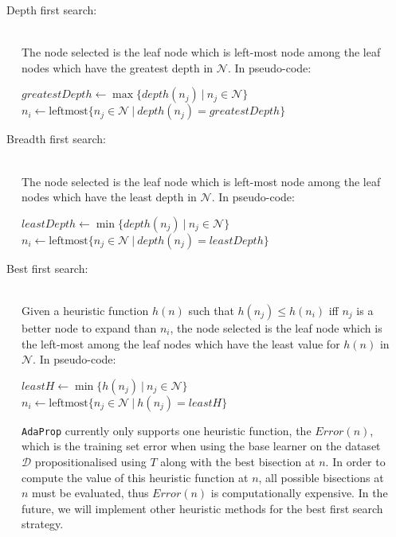 \documentclass[a4paper,12pt]{article} %
\newcommand{\AdaProp}{\texttt{AdaProp}\xspace}
\newcommand{\mcl}[1]{\mathcal{#1}}
\begin{document}
\begin{description}
\item[~~~Depth first search:] \ \\
    The node selected is the leaf node 
    which is left-most node among 
    the leaf nodes which have the greatest depth
    in $\mcl{N}$.
    In pseudo-code:
\begin{algorithmic}
    \State $ greatestDepth \gets \max\{ depth(n_j) ~\big|~ n_j \in \mcl{N} \} $
    \State $ n_i \gets \textrm{leftmost}\{ n_j \in \mcl{N} ~\big|~ depth(n_j) = greatestDepth \} $
\end{algorithmic}
        
\item[~~~Breadth first search:] \ \\
    The node selected is the leaf node 
    which is left-most node among 
    the leaf nodes which have the least depth
    in $\mcl{N}$.
    In pseudo-code:
\begin{algorithmic}
    \State $ leastDepth \gets \min\{ depth(n_j) ~\big|~ n_j \in \mcl{N} \} $
    \State $ n_i \gets \textrm{leftmost}\{ n_j \in \mcl{N} ~\big|~ depth(n_j) = leastDepth \} $
\end{algorithmic}
    
\item[~~~Best first search:] \ \\
    Given a heuristic function $h(n)$ such that
    $h(n_j) \leq h(n_i)$ iff $n_j$ is a better node to expand than $n_i$,
    the node selected is the leaf node 
    which is the left-most among 
    the leaf nodes which have the least value for $h(n)$
    in $\mcl{N}$.
    In pseudo-code:
\begin{algorithmic}
    \State $ leastH \gets \min\{ h(n_j) ~\big|~ n_j \in \mcl{N} \} $
    \State $ n_i \gets \textrm{leftmost}\{ n_j \in \mcl{N} ~\big|~ h(n_j) = leastH \} $
\end{algorithmic}

    \AdaProp currently only supports one heuristic function, 
        the $Error(n)$, which is the training set error 
        when using the base learner on the dataset $\mcl{D}$
        propositionalised using $T$ along with 
        the best bisection at $n$.
     In order to compute the value of this heuristic function at $n$,
         all possible bisections at $n$ must be evaluated,
         thus $Error(n)$ is computationally expensive.
     In the future, we will implement other heuristic methods
         for the best first search strategy.
    
\end{description}
\end{document}
